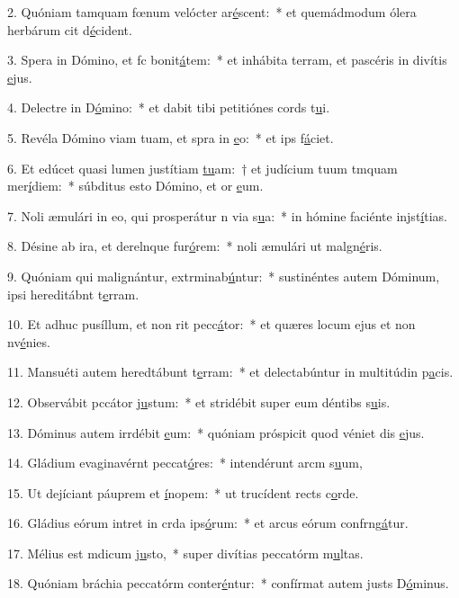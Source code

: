 2. Quóniam tamquam fœnum velócter ar\uline{é}scent:~* et quemádmodum ólera herbárum cit d\uline{é}cident.\par 
3. Spera in Dómino, et fc bonit\uline{á}tem:~* et inhábita terram, et pascéris in divítis \uline{e}jus.\par 
4. Delectre in D\uline{ó}mino:~* et dabit tibi petitiónes cords t\uline{u}i.\par 
5. Revéla Dómino viam tuam, et spra in \uline{e}o:~* et ips f\uline{á}ciet.\par 
6. Et edúcet quasi lumen justítiam \uline{tu}am:~† et judícium tuum tmquam mer\uline{í}diem:~* súbditus esto Dómino, et or \uline{e}um.\par 
7. Noli æmulári in eo, qui prosperátur n via s\uline{u}a:~* in hómine faciénte injst\uline{í}tias.\par 
8. Désine ab ira, et derelnque fur\uline{ó}rem:~* noli æmulári ut malgn\uline{é}ris.\par 
9. Quóniam qui malignántur, extrminab\uline{ú}ntur:~* sustinéntes autem Dóminum, ipsi hereditábnt t\uline{e}rram.\par 
10. Et adhuc pusíllum, et non rit pecc\uline{á}tor:~* et quæres locum ejus et non nv\uline{é}nies.\par 
11. Mansuéti autem heredtábunt t\uline{e}rram:~* et delectabúntur in multitúdin p\uline{a}cis.\par 
12. Observábit pccátor j\uline{u}stum:~* et stridébit super eum déntibs s\uline{u}is.\par 
13. Dóminus autem irrdébit \uline{e}um:~* quóniam próspicit quod véniet dis \uline{e}jus.\par 
14. Gládium evaginavérnt peccat\uline{ó}res:~* intendérunt arcm s\uline{u}um,\par 
15. Ut dejíciant páuprem et \uline{í}nopem:~* ut trucídent rects c\uline{o}rde.\par 
16. Gládius eórum intret in crda ips\uline{ó}rum:~* et arcus eórum confrng\uline{á}tur.\par 
17. Mélius est mdicum j\uline{u}sto,~* super divítias peccatórm m\uline{u}ltas.\par 
18. Quóniam bráchia peccatórm conter\uline{é}ntur:~* confírmat autem justs D\uline{ó}minus.\par 
